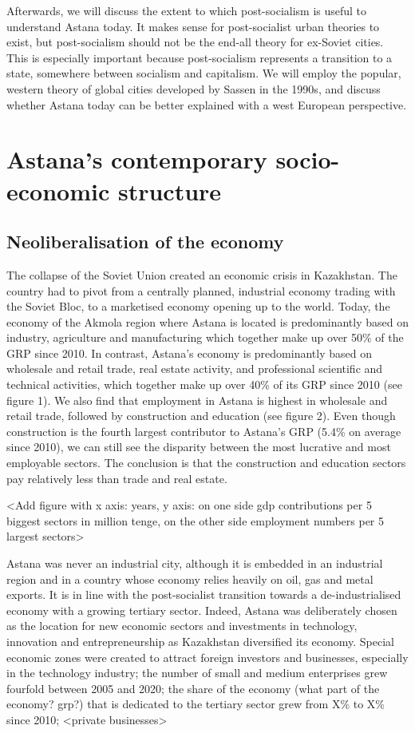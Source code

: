 \documentclass{article}
\begin{document}
Afterwards, we will discuss the extent to which post-socialism is useful to understand Astana today. It makes sense for post-socialist urban theories to exist, but post-socialism should not be the end-all theory for ex-Soviet cities. This is especially important because post-socialism represents a transition to a state, somewhere between socialism and capitalism. 
We will employ the popular, western theory of global cities developed by Sassen in the 1990s, and discuss whether Astana today can be better explained with a west European perspective.

\section{Astana's contemporary socio-economic structure}

\subsection{Neoliberalisation of the economy}

The collapse of the Soviet Union created an economic crisis in Kazakhstan. The country had to pivot from a centrally planned, industrial economy trading with the Soviet Bloc, to a marketised economy opening up to the world. Today, the economy of the Akmola region where Astana is located is predominantly based on industry, agriculture and manufacturing which together make up over 50\% of the GRP since 2010. In contrast, Astana's economy is predominantly based on wholesale and retail trade, real estate activity, and professional scientific and technical activities, which together make up over 40\% of its GRP since 2010 (see figure 1).  We also find that employment in Astana is highest in wholesale and retail trade, followed by construction and education (see figure 2). Even though construction is the fourth largest contributor to Astana's GRP (5.4\% on average since 2010), we can still see the disparity between the most lucrative and most employable sectors. The conclusion is that the construction and education sectors pay relatively less than trade and real estate.

<Add figure with x axis: years, y axis: on one side gdp contributions per 5 biggest sectors in million tenge, on the other side employment numbers per 5 largest sectors>

Astana was never an industrial city, although it is embedded in an industrial region and in a country whose economy relies heavily on oil, gas and metal exports. It is in line with the post-socialist transition towards a de-industrialised economy with a growing tertiary sector.
Indeed, Astana was deliberately chosen as the location for new economic sectors and investments in technology, innovation and entrepreneurship as Kazakhstan diversified its economy. Special economic zones were created to attract foreign investors and businesses, especially in the technology industry; the number of small and medium enterprises grew fourfold between 2005 and 2020; the share of the economy (what part of the economy? grp?) that is dedicated to the tertiary sector grew from X\% to X\% since 2010; <private businesses>
\end{document}
